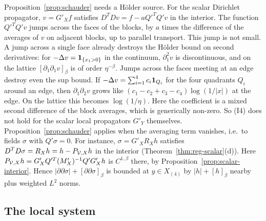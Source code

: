 \begin{remark}\label{rem:schauder-averaging}
Proposition~\ref{prop:schauder} needs a H\"older source. For the scalar Dirichlet propagator, $v=G'_Xf$ satisfies $D^TDv=f-aQ'^TQ'v$ in the interior. The function $Q'^TQ'v$ jumps across the faces of the blocks, by $a$ times the difference of the averages of $v$ on adjacent blocks, up to parallel transport. This jump is not small. A jump across a single face already destroys the H\"older bound on second derivatives: for $-\Delta v=\mathbf 1_{\{x_1>0\}}$ in the continuum, $\partial_1^2v$ is discontinuous, and on the lattice $[\partial_1\partial_1v]_\beta$ is of order $\eta^{-\beta}$. Jumps across the faces meeting at an edge destroy even the sup bound. If $-\Delta v=\sum_{i=1}^4c_i\mathbf 1_{Q_i}$ for the four quadrants $Q_i$ around an edge, then $\partial_1\partial_2v$ grows like $(c_1-c_2+c_3-c_4)\log(1/|x|)$ at the edge. On the lattice this becomes $\log(1/\eta)$. Here the coefficient is a mixed second difference of the block averages, which is generically non-zero. So (I4) does not hold for the scalar local propagators $G'_Y$ themselves. Proposition~\ref{prop:schauder} applies when the averaging term vanishes, i.e.\ to fields $\sigma$ with $Q'\sigma=0$. For instance, $\sigma=G'_XR_Xh$ satisfies $D^TD\sigma=R_Xh=h-P_{\mathcal V,X}h$ in the interior (Theorem~\ref{thm:reg-scalar}(d)). Here $P_{\mathcal V,X}h=G'_XQ'^T(M'_X)^{-1}Q'G'_Xh$ is $C^{1,\beta}$ there, by Proposition~\ref{prop:scalar-interior}. Hence $|\partial\partial\sigma|+[\partial\partial\sigma]_\beta$ is bounded at $y\in X_{(4)}$ by $|h|+[h]_\beta$ nearby plus weighted $L^2$ norms.
\end{remark}

\subsection{The local system}\label{ss:43.4}

